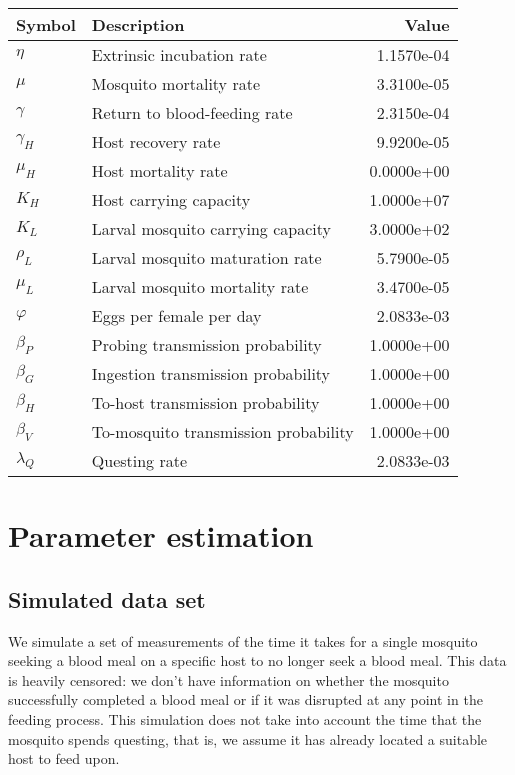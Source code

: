 \documentclass[
]{article}
\begin{document}
\begin{longtable}[]{@{}llr@{}}
\toprule\noalign{}
Symbol & Description & Value \\
\midrule\noalign{}
\endhead
\bottomrule\noalign{}
\endlastfoot
\(\eta\) & Extrinsic incubation rate & 1.1570e-04 \\
\(\mu\) & Mosquito mortality rate & 3.3100e-05 \\
\(\gamma\) & Return to blood-feeding rate & 2.3150e-04 \\
\(\gamma_H\) & Host recovery rate & 9.9200e-05 \\
\(\mu_H\) & Host mortality rate & 0.0000e+00 \\
\(K_H\) & Host carrying capacity & 1.0000e+07 \\
\(K_L\) & Larval mosquito carrying capacity & 3.0000e+02 \\
\(\rho_L\) & Larval mosquito maturation rate & 5.7900e-05 \\
\(\mu_L\) & Larval mosquito mortality rate & 3.4700e-05 \\
\(\varphi\) & Eggs per female per day & 2.0833e-03 \\
\(\beta_P\) & Probing transmission probability & 1.0000e+00 \\
\(\beta_G\) & Ingestion transmission probability & 1.0000e+00 \\
\(\beta_H\) & To-host transmission probability & 1.0000e+00 \\
\(\beta_V\) & To-mosquito transmission probability & 1.0000e+00 \\
\(\lambda_Q\) & Questing rate & 2.0833e-03 \\
\end{longtable}

\section{Parameter estimation}\label{parameter-estimation}

\subsection{Simulated data set}\label{simulated-data-set}

We simulate a set of measurements of the time it takes for a single
mosquito seeking a blood meal on a specific host to no longer seek a
blood meal. This data is heavily censored: we don't have information on
whether the mosquito successfully completed a blood meal or if it was
disrupted at any point in the feeding process. This simulation does not
take into account the time that the mosquito spends questing, that is,
we assume it has already located a suitable host to feed upon.
\end{document}
